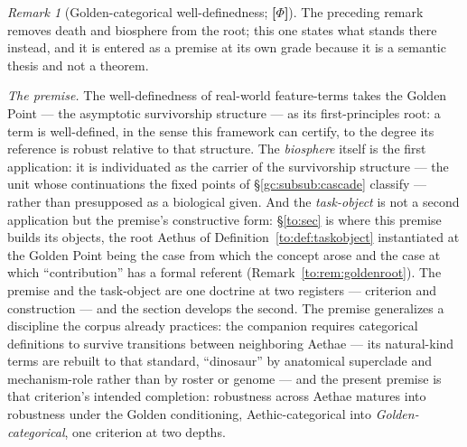 \documentclass[11pt]{article}
\numberwithin{equation}{section}
\theoremstyle{plain}
\theoremstyle{definition}
\theoremstyle{remark}
\newtheorem{remark}[theorem]{Remark}
\begin{document}
\begin{remark}[Golden-categorical well-definedness; \textbf{[$\Phi$]}]
\label{gr1:rem:goldendef}
The preceding remark removes death and biosphere from the root; this
one states what stands there instead, and it is entered as a premise
at its own grade because it is a semantic thesis and not a theorem.

\emph{The premise.} The well-definedness of real-world feature-terms
takes the Golden Point --- the asymptotic survivorship structure ---
as its first-principles root: a term is well-defined, in the sense
this framework can certify, to the degree its reference is robust
relative to that structure. The \emph{biosphere} itself is the first
application: it is individuated as the carrier of the survivorship
structure --- the unit whose continuations the fixed points of
\S\ref{gc:subsub:cascade} classify --- rather than presupposed as a
biological given. And the \emph{task-object} is not a second
application but the premise's constructive form: \S\ref{to:sec} is
where this premise builds its objects, the root Aethus of
Definition~\ref{to:def:taskobject} instantiated at the Golden Point
being the case from which the concept arose and the case at which
``contribution'' has a formal referent
(Remark~\ref{to:rem:goldenroot}). The premise and the task-object are
one doctrine at two registers --- criterion and construction --- and
the section develops the second. The premise generalizes a discipline the corpus
already practices: the companion requires categorical definitions to
survive transitions between neighboring Aethae --- its natural-kind
terms are rebuilt to that standard, ``dinosaur'' by anatomical
superclade and mechanism-role rather than by roster or genome
\cite{Nexus} --- and the present premise is that criterion's intended
completion: robustness across Aethae matures into robustness under
the Golden conditioning, Aethic-categorical into
\emph{Golden-categorical}, one criterion at two depths.


\end{remark}
\end{document}
